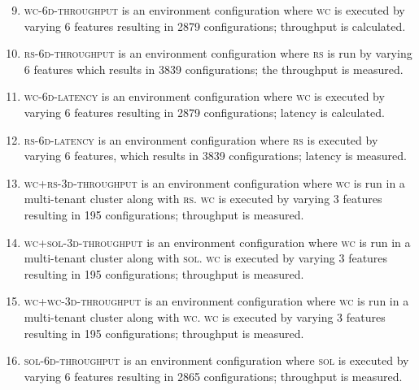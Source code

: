 \begin{enumerate}
    \setcounter{enumi}{8}
    \item {} \textsc{\textsc{wc}-6d-throughput} is an environment configuration where \textsc{wc} is executed by varying 6 features resulting in 2879 configurations;  throughput is calculated.

    \item {} \textsc{\textsc{rs}-6d-throughput} is an environment configuration where \textsc{rs} is run by varying 6 features which results in 3839 configurations; the throughput is measured.
    
    \item {} \textsc{\textsc{wc}-6d-latency} is an environment configuration where \textsc{wc} is executed by varying 6 features resulting in 2879 configurations; latency is calculated.
    
    \item {} \textsc{\textsc{rs}-6d-latency} is an environment configuration where \textsc{rs} is executed by varying 6 features, which results in 3839 configurations; latency is measured.
    
    \item {} \textsc{ \textsc{wc}+\textsc{rs}-3d-throughput} is an environment configuration where \textsc{wc} is run in a multi-tenant cluster along with \textsc{rs}. \textsc{wc} is executed by varying 3 features resulting in 195 configurations; throughput is measured.
    
    \item {} \textsc{\textsc{wc}+\textsc{sol}-3d-throughput} is an environment configuration where \textsc{wc} is run in a multi-tenant cluster along with \textsc{sol}. \textsc{wc} is executed by varying 3 features resulting in 195 configurations; throughput is measured.
    
    \item {} \textsc{\textsc{wc}+\textsc{wc}-3d-throughput} is an environment configuration where \textsc{wc} is run in a multi-tenant cluster along with \textsc{wc}. \textsc{wc} is executed by varying 3 features resulting in 195 configurations; throughput is measured.
    
    \item {} \textsc{\textsc{sol}-6d-throughput} is an environment configuration where \textsc{sol} is executed by varying 6 features resulting in 2865 configurations; throughput is measured.
        

\end{enumerate}
